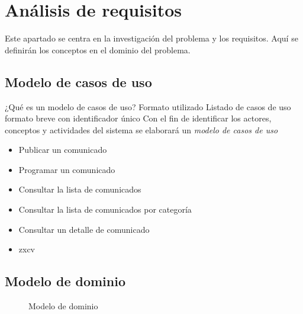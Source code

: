 \chapter{Análisis de requisitos}
Este apartado se centra en la investigación del problema y los requisitos. Aquí se definirán los conceptos en el dominio del problema.

\section{Modelo de casos de uso}

¿Qué es un modelo de casos de uso?
Formato utilizado
Listado de casos de uso formato breve con identificador único
Con el fin de identificar los actores, conceptos y actividades del sistema se elaborará un \emph{modelo de casos de uso} \cite{Jacobson1999} \cite{Larman2004}

\begin{itemize}
    \item Publicar un comunicado
    \item Programar un comunicado
    \item Consultar la lista de comunicados
    \item Consultar la lista de comunicados por categoría
    \item Consultar un detalle de comunicado
    \item zxcv
\end{itemize}


\section{Modelo de dominio}

\begin{figure}
    \centering
    \caption{Modelo de dominio}
\end{figure}

